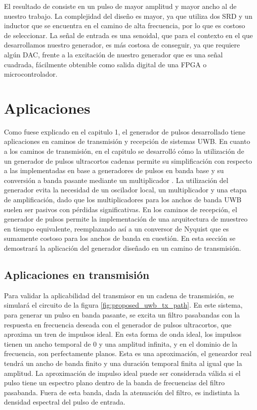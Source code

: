 El resultado de \cite{oloumi2018} consiste en un pulso de mayor amplitud y mayor
ancho al de nuestro trabajo. La complejidad del diseño es mayor, ya que utiliza
dos SRD y un inductor que se encuentra en el camino de alta frecuencia, por lo
que es costoso de seleccionar. La señal de entrada es una senoidal, que para el
contexto en el que desarrollamos nuestro generador, es más costosa de conseguir,
ya que requiere algún DAC, frente a la excitación de nuestro generador que es
una señal cuadrada, fácilmente obtenible como salida digital de una FPGA o
microcontrolador.

\section{Aplicaciones}

Como fuese explicado en el capitulo 1, el generador de pulsos desarrollado tiene
aplicaciones en caminos de transmisión y recepción de sistemas UWB. En cuanto a
los caminos de transmisión, en el
capitulo se desarrolló cómo la utilización de un generador de pulsos ultracortos
cadenas permite su simplificación con respecto a las implementadas en
base a generadores de pulsos en banda base y su conversión a banda pasante
mediante un multiplicador \cite{Altieri2021}. La utilización del generador
evita la necesidad de un oscilador local, un multiplicador y una etapa de
amplificación, dado que los multiplicadores para los anchos de banda UWB suelen
ser pasivos con pérdidas significativas. En los caminos de recepción, el
generador de pulsos permite la implementación de una arquitectura de muestreo en
tiempo equivalente, reemplazando así a un conversor de Nyquist que es sumamente
costoso para los anchos de banda en cuestión. En esta sección se demostrará la
aplicación del generador diseñado en un camino de transmisión.

\subsection{Aplicaciones en transmisión}

Para validar la aplicabilidad del transmisor en un cadena de transmisión, se
simulará el circuito de la figura \ref{fig:proposed_uwb_tx_path}. En este
sistema, para generar un pulso en banda pasante, se excita un filtro pasabandas
con la respuesta en frecuencia deseada con el generador de pulsos ultracortos,
que aproxima un tren de impulsos ideal.  En esta forma de onda ideal, los
impulsos tienen un ancho temporal de 0 y una amplitud infinita, y en el dominio
de la frecuencia, son perfectamente planos.  Esta es una aproximación, el
geneardor real tendrá un ancho de banda finito y una duración temporal finita al
igual que la amplitud. La aproximación de impulso ideal puede ser considerada
válida si el pulso tiene un espectro plano dentro de la banda de frecuencias del
filtro pasabanda. Fuera de esta banda, dada la atenuación del filtro, es
indistinta la densidad espectral del pulso de entrada.

